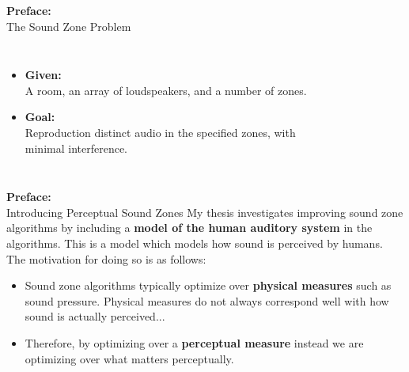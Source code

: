 \documentclass[aspectratio=169]{beamer}
\begin{document}
\begin{frame}{\textbf{Preface:}\\ The Sound Zone Problem}
    \begin{columns}[c]
        \begin{itemize}
            \item \textbf{Given:}\\ A room, an array of loudspeakers, and a number of zones.
            \item \textbf{Goal:}\\  Reproduction distinct audio in the specified zones, with minimal interference.
        \end{itemize}
        \begin{figure}[]
            \centering
            \scalebox{0.7}{}
        \end{figure}
    \end{columns}
\end{frame}

\begin{frame}{\textbf{Preface:}\\ Introducing Perceptual Sound Zones}
    My thesis investigates improving sound zone algorithms by including a \textbf{model of the human auditory system} in the algorithms.
    This is a model which models how sound is perceived by humans.\\
    \vspace{10pt}
    The motivation for doing so is as follows:
    \begin{itemize}
        \item Sound zone algorithms typically optimize over \textbf{physical measures} such as sound pressure.
            Physical measures do not always correspond well with how sound is actually perceived...
        \item Therefore, by optimizing over a \textbf{perceptual measure} instead we are optimizing over what matters perceptually.
    \end{itemize}
\end{frame}

\end{document}
